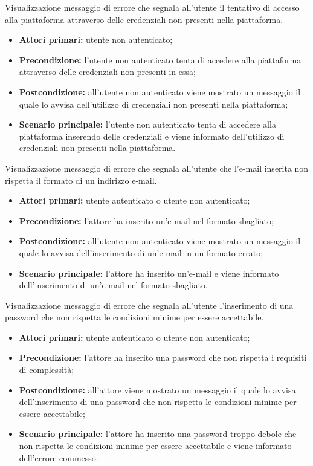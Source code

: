 \hypertarget{CredenzialiNonPresenti}{}
Visualizzazione messaggio di errore che segnala all'utente il tentativo di accesso alla piattaforma attraverso delle credenziali non presenti nella piattaforma.
\begin{itemize}
    \item \textbf{Attori primari:} utente non autenticato;
    \item \textbf{Precondizione:} l'utente non autenticato tenta di accedere alla piattaforma attraverso delle credenziali non presenti in essa;
    \item \textbf{Postcondizione:} all'utente non autenticato viene mostrato un messaggio il quale lo avvisa dell'utilizzo di credenziali non presenti nella piattaforma;
    \item \textbf{Scenario principale:} l'utente non autenticato tenta di accedere alla piattaforma inserendo delle credenziali e viene informato dell'utilizzo di credenziali non presenti nella piattaforma.
\end{itemize}

\hypertarget{EmailInvalida}{}
Visualizzazione messaggio di errore che segnala all'utente che l'e-mail inserita non rispetta il formato di un indirizzo e-mail.
\begin{itemize}
    \item \textbf{Attori primari:} utente autenticato o utente non autenticato;
    \item \textbf{Precondizione:} l'attore ha inserito un'e-mail nel formato sbagliato;
    \item \textbf{Postcondizione:} all'utente non autenticato viene mostrato un messaggio il quale lo avvisa dell'inserimento di un'e-mail in un formato errato;
    \item \textbf{Scenario principale:} l'attore ha inserito un'e-mail e viene informato dell'inserimento di un'e-mail nel formato sbagliato.
\end{itemize}

\hypertarget{PasswordInvalida}{}
Visualizzazione messaggio di errore che segnala all'utente l'inserimento di una password che non rispetta le condizioni minime per essere accettabile.
\begin{itemize}
    \item \textbf{Attori primari:} utente autenticato o utente non autenticato;
    \item \textbf{Precondizione:} l'attore ha inserito una password che non rispetta i requisiti di complessità;
    \item \textbf{Postcondizione:} all'attore viene mostrato un messaggio il quale lo avvisa dell'inserimento di una password che non rispetta le condizioni minime per essere accettabile;
    \item \textbf{Scenario principale:} l'attore ha inserito una password troppo debole che non rispetta le condizioni minime per essere accettabile e viene informato dell'errore commesso.
\end{itemize}

